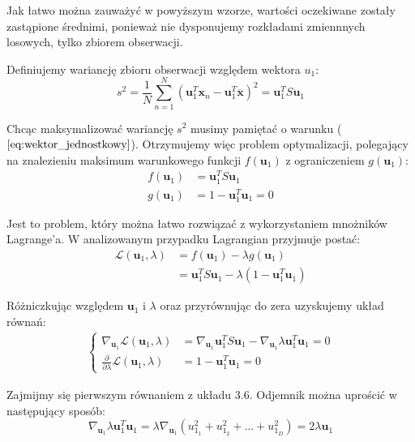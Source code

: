 \documentclass[oneside, eng]{mgr}
\newcommand{\bb}{\textbf}
\begin{document}
Jak łatwo można zauważyć w powyższym wzorze, wartości oczekiwane zostały zastąpione średnimi, ponieważ nie dysponujemy rozkładami zmiennnych losowych, tylko zbiorem obserwacji.

Definiujemy wariancję zbioru obserwacji względem wektora $u_1$:
\begin{equation}
	s^2 = \frac{1}{N} \sum_{n=1}^{N}(\bb{u}_1^T \bb{x}_n - \bb{u}_1^T\overline{\bb{x}})^2 = \bb{u}_1^T S \bb{u}_1
\end{equation}

Chcąc maksymalizować wariancję $s^2$ musimy pamiętać o warunku ($\ref{eq:wektor_jednostkowy}$). Otrzymujemy więc problem optymalizacji, polegający na znalezieniu maksimum warunkowego funkcji $f(\bb{u}_1)$ z ograniczeniem $g(\bb{u}_1)$:
\begin{align*}
	f(\bb{u}_1) &= \bb{u}_1^T S \bb{u}_1 \\
	g(\bb{u}_1) &= 1 - \bb{u}_1^T \bb{u}_1 = 0
\end{align*}

Jest to problem, który można łatwo rozwiązać z wykorzystaniem mnożników Lagrange'a. W analizowanym przypadku Lagrangian przyjmuje postać:
\begin{align*}
	\mathcal{L}(\bb{u}_1, \lambda) &= f(\bb{u}_1) - \lambda g(\bb{u}_1) \\
				&= \bb{u}_1^T S \bb{u}_1 - \lambda(1 - \bb{u}_1^T \bb{u}_1)
\end{align*}

Różniczkując względem $\bb{u}_1$ i $\lambda$ oraz przyrównując do zera uzyskujemy układ równań:
\begin{align} 
\begin{cases}
	\nabla_{\bb{u}_1} \mathcal{L} (\bb{u}_1, \lambda) &= \nabla_{\bb{u}_1} \bb{u}_1^T S \bb{u}_1 - \nabla_{\bb{u}_1} \lambda \bb{u}_1^T \bb{u}_1 = 0 \\
	\frac{\partial}{\partial \lambda} \mathcal{L} (\bb{u}_1, \lambda) &= 1 - \bb{u}_1^T \bb{u}_1 = 0
\end{cases}
\end{align}

Zajmijmy się pierwszym równaniem z układu $3.6$. Odjemnik można uprościć w następujący sposób:
\begin{equation}
	\nabla_{\bb{u}_1} \lambda \bb{u}_1^T \bb{u}_1 = \lambda \nabla_{\bb{u}_1} 
		(u_{1_1}^2 + u_{1_2}^2 + ... + u_{1_D}^2)
	 	= 2 \lambda \bb{u}_1
\end{equation}
\end{document}
